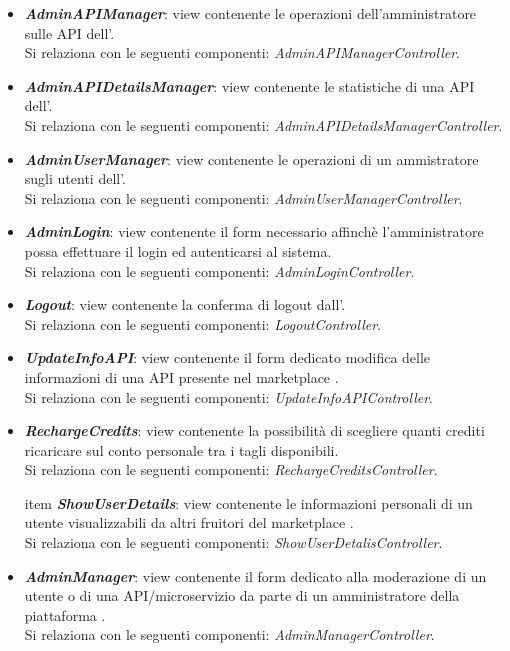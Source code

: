 \begin{itemize}
\begin{itemize}
		\item \textbf{\textit{AdminAPIManager}}: view contenente le operazioni dell'amministratore sulle API dell'\progetto.\\
		Si relaziona con le seguenti componenti: \textit{AdminAPIManagerController}.
		
		\item \textbf{\textit{AdminAPIDetailsManager}}: view contenente le statistiche di una API dell'\progetto.\\
		Si relaziona con le seguenti componenti: \textit{AdminAPIDetailsManagerController}.
		
		\item \textbf{\textit{AdminUserManager}}: view contenente le operazioni di un ammistratore sugli utenti dell'\progetto.\\
		Si relaziona con le seguenti componenti: \textit{AdminUserManagerController}.
		
		\item \textbf{\textit{AdminLogin}}: view contenente il form necessario affinchè l'amministratore possa effettuare il login ed autenticarsi al sistema.\\
		Si relaziona con le seguenti componenti: \textit{AdminLoginController}.
		
		\item \textbf{\textit{Logout}}: view contenente la conferma di logout dall'\progetto.\\
		Si relaziona con le seguenti componenti: \textit{LogoutController}.
		
		\item \textbf{\textit{UpdateInfoAPI}}: view contenente il form dedicato modifica delle informazioni di una API presente nel marketplace \progetto.\\
		Si relaziona con le seguenti componenti: \textit{UpdateInfoAPIController}.
		
		\item \textbf{\textit{RechargeCredits}}: view contenente la possibilità di scegliere quanti crediti ricaricare sul conto personale tra i tagli disponibili.\\
		Si relaziona con le seguenti componenti: \textit{RechargeCreditsController}.
		
		item \textbf{\textit{ShowUserDetails}}: view contenente le informazioni personali di un utente visualizzabili da altri fruitori del marketplace \progetto.\\
		Si relaziona con le seguenti componenti: \textit{ShowUserDetalisController}.
		
		\item \textbf{\textit{AdminManager}}: view contenente il form dedicato alla moderazione di un utente o di una API/microservizio da parte di un amministratore della piattaforma \progetto.\\
		Si relaziona con le seguenti componenti: \textit{AdminManagerController}.
	\end{itemize}
\end{itemize}

